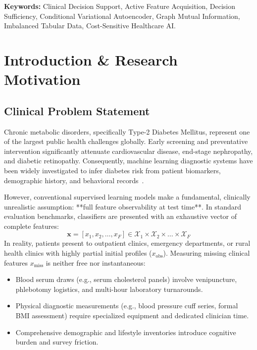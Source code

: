 \documentclass[11pt,a4paper]{report}
\begin{document}
\vspace{1em}
\noindent\textbf{Keywords:} Clinical Decision Support, Active Feature Acquisition, Decision Sufficiency, Conditional Variational Autoencoder, Graph Mutual Information, Imbalanced Tabular Data, Cost-Sensitive Healthcare AI.

\clearpage
\tableofcontents
\clearpage
\listoffigures
\clearpage
\listoftables
\clearpage

\setcounter{page}{1}

\chapter{Introduction \& Research Motivation}

\section{Clinical Problem Statement}
Chronic metabolic disorders, specifically Type-2 Diabetes Mellitus, represent one of the largest public health challenges globally. Early screening and preventative intervention significantly attenuate cardiovascular disease, end-stage nephropathy, and diabetic retinopathy. Consequently, machine learning diagnostic systems have been widely investigated to infer diabetes risk from patient biomarkers, demographic history, and behavioral records~\cite{teboul2021diabetes,cdc2015brfss}.

However, conventional supervised learning models make a fundamental, clinically unrealistic assumption: **full feature observability at test time**. In standard evaluation benchmarks, classifiers are presented with an exhaustive vector of complete features:
\begin{equation}
  \mathbf{x} = [x_1, x_2, \dots, x_F] \in \mathcal{X}_1 \times \mathcal{X}_2 \times \dots \times \mathcal{X}_F
\end{equation}
In reality, patients present to outpatient clinics, emergency departments, or rural health clinics with highly partial initial profiles ($x_{\text{obs}}$). Measuring missing clinical features $x_{\text{miss}}$ is neither free nor instantaneous:
\begin{itemize}[noitemsep]
  \item Blood serum draws (e.g., serum cholesterol panels) involve venipuncture, phlebotomy logistics, and multi-hour laboratory turnarounds.
  \item Physical diagnostic measurements (e.g., blood pressure cuff series, formal BMI assessment) require specialized equipment and dedicated clinician time.
  \item Comprehensive demographic and lifestyle inventories introduce cognitive burden and survey friction.
\end{itemize}
\end{document}
